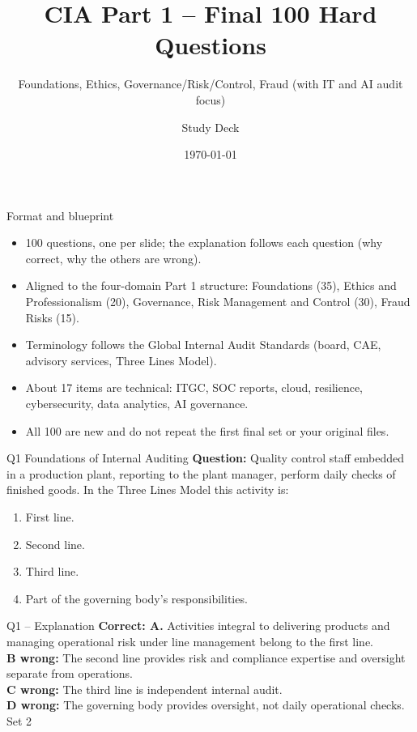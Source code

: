 \documentclass[aspectratio=169,10pt]{beamer}
\title{CIA Part 1 -- Final 100 Hard Questions}
\subtitle{Foundations, Ethics, Governance/Risk/Control, Fraud (with IT and AI audit focus)}
\author{Study Deck}
\date{\today}
\begin{document}
\begin{frame}\titlepage\end{frame}
\begin{frame}{Format and blueprint}
\small
\begin{itemize}
\item 100 questions, one per slide; the explanation follows each question (why correct, why the others are wrong).
\item Aligned to the four-domain Part 1 structure: Foundations (35), Ethics and Professionalism (20), Governance, Risk Management and Control (30), Fraud Risks (15).
\item Terminology follows the Global Internal Audit Standards (board, CAE, advisory services, Three Lines Model).
\item About 17 items are technical: ITGC, SOC reports, cloud, resilience, cybersecurity, data analytics, AI governance.
\item All 100 are new and do not repeat the first final set or your original files.
\end{itemize}
\end{frame}

\begin{frame}[t]{Q1 \hfill {\scriptsize Foundations of Internal Auditing}}
	\small
	\textbf{Question:} Quality control staff embedded in a production plant, reporting to the plant manager, perform daily checks of finished goods. In the Three Lines Model this activity is:
	\begin{enumerate}[label=\Alph*.,itemsep=1pt,topsep=3pt]
			\item First line.
			\item Second line.
			\item Third line.
			\item Part of the governing body's responsibilities.
	\end{enumerate}
\end{frame}

\begin{frame}[t]{Q1 -- Explanation}
	\footnotesize
	\textbf{Correct: A.} Activities integral to delivering products and managing operational risk under line management belong to the first line. \\[5pt]
\textbf{B wrong:} The second line provides risk and compliance expertise and oversight separate from operations. \\[3pt]
\textbf{C wrong:} The third line is independent internal audit. \\[3pt]
\textbf{D wrong:} The governing body provides oversight, not daily operational checks. \\[3pt]
	\vfill {\tiny Set 2}
\end{frame}
\end{document}
